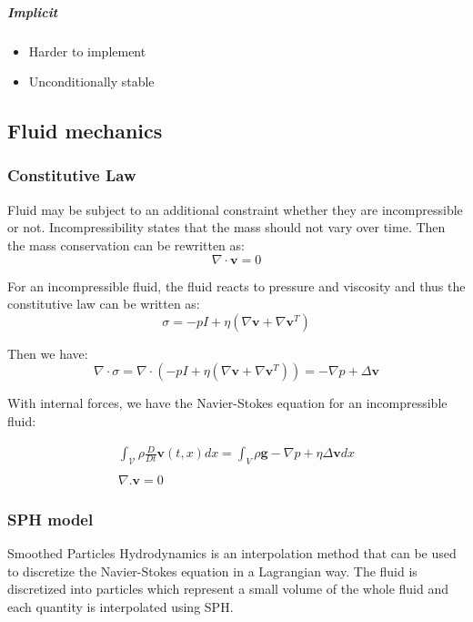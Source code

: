 \subparagraph{Implicit}
\begin{itemize}
\item Harder to implement
\item Unconditionally stable
\end{itemize}

\subsection{Fluid mechanics}

\subsubsection{Constitutive Law}

Fluid may be subject to an additional constraint whether they are incompressible or not. Incompressibility states that the mass should not vary over time. Then the mass conservation can be rewritten as:
\begin{equation}
\nabla \cdot \mathbf{v} = 0
\end{equation}

For an incompressible fluid, the fluid reacts to pressure and viscosity and thus the constitutive law can be written as:
\begin{equation}
\sigma = -pI + \eta \left( \nabla \mathbf{v} + \nabla \mathbf{v}^{T} \right)
\end{equation}

Then we have:
\begin{equation}
\nabla \cdot \sigma = \nabla \cdot \left( -pI + \eta \left( \nabla \mathbf{v} + \nabla \mathbf{v}^{T} \right) \right) = -\nabla p + \Delta \mathbf{v}
\end{equation}

With internal forces, we have the Navier-Stokes equation for an incompressible fluid:

\begin{equation}
\begin{array}{ll}
\displaystyle
\int_{\mathcal{V}} \rho \frac{D}{Dt} \mathbf{v}(t,x) dx = \int_{V} \rho \mathbf{g} -\nabla p + \eta \Delta \mathbf{v} dx \\ \\
\displaystyle
\nabla. \mathbf{v} = 0
\end{array}
\end{equation}

\subsubsection{SPH model}
Smoothed Particles Hydrodynamics is an interpolation method that can be used to discretize the Navier-Stokes equation in a Lagrangian way. The fluid is discretized into particles which represent a small volume of the whole fluid and each quantity is interpolated using SPH.

